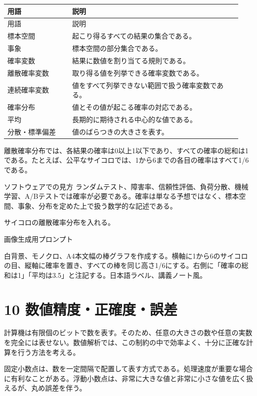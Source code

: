\documentclass[uplatex,dvipdfmx,a4paper,10pt]{jsarticle}
\begin{document}
\begin{longtable}{>{\raggedright\arraybackslash}p{0.26\linewidth} >{\raggedright\arraybackslash}p{0.68\linewidth}}
\toprule
用語 & 説明 \\
\midrule
\endfirsthead
\toprule
用語 & 説明 \\
\midrule
\endhead
標本空間 & 起こり得るすべての結果の集合である。 \\
事象 & 標本空間の部分集合である。 \\
確率変数 & 結果に数値を割り当てる規則である。 \\
離散確率変数 & 取り得る値を列挙できる確率変数である。 \\
連続確率変数 & 値をすべて列挙できない範囲で扱う確率変数である。 \\
確率分布 & 値とその値が起こる確率の対応である。 \\
平均 & 長期的に期待される中心的な値である。 \\
分散・標準偏差 & 値のばらつきの大きさを表す。 \\
\bottomrule
\end{longtable}
離散確率分布では、各結果の確率は0以上1以下であり、すべての確率の総和は1である。たとえば、公平なサイコロでは、1から6までの各目の確率はすべて1/6である。

\begin{infobox}{ソフトウェアでの見方}
ランダムテスト、障害率、信頼性評価、負荷分散、機械学習、A/Bテストでは確率が必要である。確率は単なる予想ではなく、標本空間、事象、分布を定めた上で扱う数学的な記述である。
\end{infobox}
\begin{todobox}
サイコロの離散確率分布を入れる。

画像生成用プロンプト

白背景、モノクロ、A4本文幅の棒グラフを作成する。横軸に1から6のサイコロの目、縦軸に確率を置き、すべての棒を同じ高さ1/6にする。右側に「確率の総和は1」「平均は3.5」と注記する。日本語ラベル、講義ノート風。
\end{todobox}
\section{10 数値精度・正確度・誤差}
計算機は有限個のビットで数を表す。そのため、任意の大きさの数や任意の実数を完全には表せない。数値解析では、この制約の中で効率よく、十分に正確な計算を行う方法を考える。

固定小数点は、数を一定間隔で配置して表す方式である。処理速度が重要な場合に有利なことがある。浮動小数点は、非常に大きな値と非常に小さな値を広く扱えるが、丸め誤差を伴う。
\end{document}
